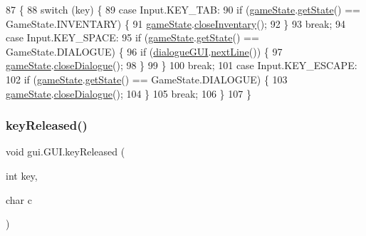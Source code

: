 \begin{DoxyCode}
87                                             \{
88         \textcolor{keywordflow}{switch} (key) \{
89             \textcolor{keywordflow}{case} Input.KEY\_TAB:
90                 \textcolor{keywordflow}{if} (\mbox{\hyperlink{classgui_1_1_g_u_i_a3c90a4cfa6b20ea3635bbc7eda176de0}{gameState}}.\mbox{\hyperlink{classstates_1_1_game_state_ab3aace79bbd3da8c4e838ac872ffb2a2}{getState}}() == GameState.INVENTARY) \{
91                     \mbox{\hyperlink{classgui_1_1_g_u_i_a3c90a4cfa6b20ea3635bbc7eda176de0}{gameState}}.\mbox{\hyperlink{classstates_1_1_game_state_a7b673342f6dc74ba4c452ff346782d04}{closeInventary}}();
92                 \}
93                 \textcolor{keywordflow}{break};
94             \textcolor{keywordflow}{case} Input.KEY\_SPACE:
95                 \textcolor{keywordflow}{if} (\mbox{\hyperlink{classgui_1_1_g_u_i_a3c90a4cfa6b20ea3635bbc7eda176de0}{gameState}}.\mbox{\hyperlink{classstates_1_1_game_state_ab3aace79bbd3da8c4e838ac872ffb2a2}{getState}}() == GameState.DIALOGUE) \{
96                     \textcolor{keywordflow}{if} (\mbox{\hyperlink{classgui_1_1_g_u_i_ae48d5f580a490dd73bc59e64937cc46f}{dialogueGUI}}.\mbox{\hyperlink{classgui_1_1_dialogue_g_u_i_a44bb149e1e51c69ba5c65b34cc1dfc3f}{nextLine}}()) \{
97                         \mbox{\hyperlink{classgui_1_1_g_u_i_a3c90a4cfa6b20ea3635bbc7eda176de0}{gameState}}.\mbox{\hyperlink{classstates_1_1_game_state_a68370a33c4250e3a8fe588e1ace01d85}{closeDialogue}}();
98                     \}
99                 \}
100                 \textcolor{keywordflow}{break};
101             \textcolor{keywordflow}{case} Input.KEY\_ESCAPE:
102                 \textcolor{keywordflow}{if} (\mbox{\hyperlink{classgui_1_1_g_u_i_a3c90a4cfa6b20ea3635bbc7eda176de0}{gameState}}.\mbox{\hyperlink{classstates_1_1_game_state_ab3aace79bbd3da8c4e838ac872ffb2a2}{getState}}() == GameState.DIALOGUE) \{
103                     \mbox{\hyperlink{classgui_1_1_g_u_i_a3c90a4cfa6b20ea3635bbc7eda176de0}{gameState}}.\mbox{\hyperlink{classstates_1_1_game_state_a68370a33c4250e3a8fe588e1ace01d85}{closeDialogue}}();
104                 \}
105                 \textcolor{keywordflow}{break};
106         \}
107     \}
\end{DoxyCode}
\mbox{\label{classgui_1_1_g_u_i_ac2f032af4a8dfc8e6aadbcdc23a9ec39}} 
\subsubsection{\texorpdfstring{key\+Released()}{keyReleased()}}
{\footnotesize\ttfamily void gui.\+G\+U\+I.\+key\+Released (\begin{DoxyParamCaption}\item[{int}]{key,  }\item[{char}]{c }\end{DoxyParamCaption})\hspace{0.3cm}{\ttfamily [inline]}}


